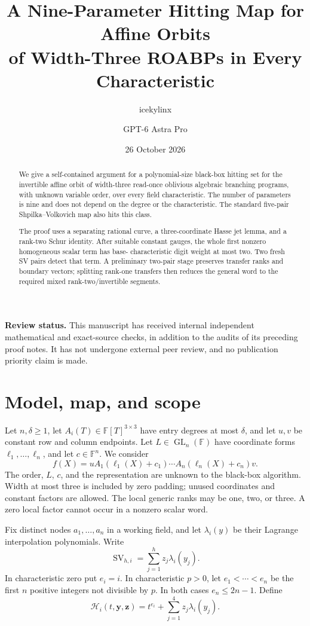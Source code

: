 \documentclass[11pt]{article}
\title{A Nine-Parameter Hitting Map for Affine Orbits\\
of Width-Three ROABPs in Every Characteristic}
\author{icekylinx \and GPT-6 Astra Pro}
\date{26 October 2026}
\newcommand{\F}{\mathbb F}
\newcommand{\SV}{\operatorname{SV}}
\newcommand{\GL}{\operatorname{GL}}
\begin{document}
\maketitle

\begin{abstract}
We give a self-contained argument for a polynomial-size black-box
hitting set for the invertible affine orbit of width-three read-once
oblivious algebraic branching programs, with unknown variable order,
over every field characteristic. The number of parameters is nine and
does not depend on the degree or the characteristic. The standard
five-pair Shpilka--Volkovich map also hits this class.

The proof uses a separating rational curve, a three-coordinate Hasse
jet lemma, and a rank-two Schur identity. After suitable constant
gauges, the whole first nonzero homogeneous scalar term has base-
characteristic digit weight at most two. Two fresh SV pairs detect
that term. A preliminary two-pair stage preserves transfer ranks and
boundary vectors; splitting rank-one transfers then reduces the
general word to the required mixed rank-two/invertible segments.
\end{abstract}

\noindent\textbf{Review status.}
This manuscript has received internal independent mathematical and
exact-source checks, in addition to the audits of its preceding proof
notes. It has not undergone external peer review, and no publication
priority claim is made.

\section{Model, map, and scope}

Let \(n,\delta\ge1\), let \(A_i(T)\in\F[T]^{3\times3}\) have entry
degrees at most \(\delta\), and let \(u,v\) be constant row and column
endpoints. Let \(L\in\GL_n(\F)\) have coordinate forms
\(\ell_1,\ldots,\ell_n\), and let \(c\in\F^n\). We consider
\begin{equation}\label{eq:model}
 f(X)=uA_1(\ell_1(X)+c_1)\cdots A_n(\ell_n(X)+c_n)v.
\end{equation}
The order, \(L\), \(c\), and the representation are unknown to the
black-box algorithm. Width at most three is included by zero padding;
unused coordinates and constant factors are allowed. The local generic
ranks may be one, two, or three. A zero local factor cannot occur in a
nonzero scalar word.

Fix distinct nodes \(a_1,\ldots,a_n\) in a working field, and let
\(\lambda_i(y)\) be their Lagrange interpolation polynomials. Write
\[
 \SV_{h,i}=\sum_{j=1}^h z_j\lambda_i(y_j).
\]
In characteristic zero put \(e_i=i\). In characteristic \(p>0\), let
\(e_1<\cdots<e_n\) be the first \(n\) positive integers not divisible
by \(p\). In both cases \(e_n\le2n-1\). Define
\begin{equation}\label{eq:map}
 \mathcal H_i(t,\boldsymbol y,\boldsymbol z)
   =t^{e_i}+\sum_{j=1}^4z_j\lambda_i(y_j).
\end{equation}
\end{document}
